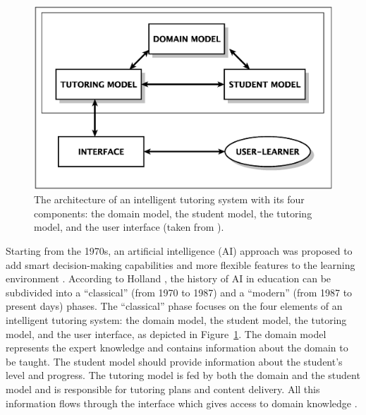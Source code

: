 \documentclass[10pt,journal,compsoc]{IEEEtran}
\begin{document}
\begin{figure}[t]
	\centering
	\includegraphics[scale=.3]{images/ITS.eps}
	\caption{The architecture of an intelligent tutoring system with its four components: the domain model, the student model, the tutoring model, and the user interface (taken from \cite{nkambou2010advances}).}
	\label{fig:ITS}       
\end{figure}

Starting from the 1970s, an artificial intelligence (AI) approach was proposed to add smart decision-making capabilities and more flexible features to the learning environment \cite{carbonell1970ai}. 
According to Holland \cite{holland2000artificial}, the history of AI in education
can be subdivided into a ``classical'' (from 1970 to 1987) and a ``modern'' (from 1987 to present days) phases. The ``classical'' phase focuses on the four elements of an intelligent tutoring system: the domain model, the student model, the tutoring model, and the user interface, as depicted in Figure~\ref{fig:ITS}. The domain model represents the expert knowledge and contains information about the domain to be taught. The student model should provide information about the student's level and progress. The tutoring model is fed by both the domain and the student model and is responsible for tutoring plans and content delivery. All this information flows through the interface which gives access to domain knowledge \cite{nkambou2010advances}. 
\end{document}
